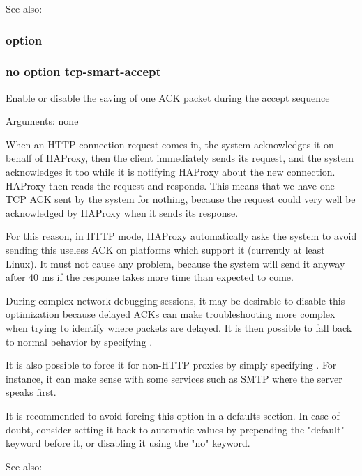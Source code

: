 {  See also: 

\subsubsection[tcp-smart-accept]{option }
\subsubsection*{no option tcp-smart-accept}


  Enable or disable the saving of one ACK packet during the accept sequence


  Arguments: none

  When an HTTP connection request comes in, the system acknowledges it on
  behalf of HAProxy, then the client immediately sends its request, and the
  system acknowledges it too while it is notifying HAProxy about the new
  connection. HAProxy then reads the request and responds. This means that we
  have one TCP ACK sent by the system for nothing, because the request could
  very well be acknowledged by HAProxy when it sends its response.

  For this reason, in HTTP mode, HAProxy automatically asks the system to avoid
  sending this useless ACK on platforms which support it (currently at least
  Linux). It must not cause any problem, because the system will send it anyway
  after 40 ms if the response takes more time than expected to come.

  During complex network debugging sessions, it may be desirable to disable
  this optimization because delayed ACKs can make troubleshooting more complex
  when trying to identify where packets are delayed. It is then possible to
  fall back to normal behavior by specifying .

  It is also possible to force it for non-HTTP proxies by simply specifying
  . For instance, it can make sense with some services
  such as SMTP where the server speaks first.

  It is recommended to avoid forcing this option in a defaults section. In case
  of doubt, consider setting it back to automatic values by prepending the
  "default" keyword before it, or disabling it using the "no" keyword.

  See also: 

}
